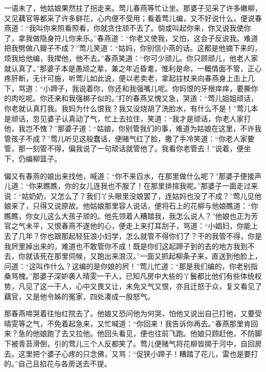 一语未了，他姑娘果然拄了拐走来。莺儿春燕等忙让坐。那婆子见采了许多嫩柳，又见藕官等都采了许多鲜花，心内便不受用；看着莺儿编，又不好说什么，便说春燕道：``我叫你来照看照看，你就贪住顽不去了。倘或叫起你来，你又说我使你了，拿我做隐身符儿你来乐。''春燕道：``你老又使我，又怕，这会子反说我。难道把我劈做八瓣子不成？''莺儿笑道：``姑妈，你别信小燕的话。这都是他摘下来的，烦我给他编，我撵他，他不去。''春燕笑道：``你可少顽儿。你只顾顽儿，他老人家就认真了。''那婆子本是愚顽之辈，兼之年近昏耄，惟利是命，一概情面不管，正心疼肝断，无计可施，听莺儿如此说，便以老卖老，拿起拄杖来向春燕身上击上几下，骂道：``小蹄子，我说着你，你还和我强嘴儿呢。你妈恨的牙根痒痒，要撕你的肉吃呢。你还来和我强梆子似的。''打的春燕又愧又急，哭道：``莺儿姐姐顽话，你老就认真打我。我妈为什么恨我？我又没烧胡了洗脸水，有什么不是！''莺儿本是顽话，忽见婆子认真动了气，忙上去拉住，笑道：``我才是顽话，你老人家打他，我岂不愧？''那婆子道：``姑娘，你别管我们的事，难道为姑娘在这里，不许我管孩子不成？''莺儿听见这般蠢话，便赌气红了脸，撒了手冷笑道：``你老人家要管，那一刻管不得，偏我说了一句顽话就管他了。我看你老管去！''说着，便坐下，仍编柳篮子。

偏又有春燕的娘出来找他，喊道：``你不来舀水，在那里做什么呢？''那婆子便接声儿道：``你来瞧瞧，你的女儿连我也不服了！在那里排揎我呢。''那婆子一面走过来说：``姑奶奶，又怎么了？我们丫头眼里没娘罢了，连姑妈也没了不成？''莺儿见他娘来了，只得又说原故。他姑娘那里容人说话，便将石上的花柳与他娘瞧道：``你瞧瞧，你女儿这么大孩子顽的。他先领着人糟踏我，我怎么说人？''他娘也正为芳官之气未平，又恨春燕不遂他的心，便走上来打耳刮子，骂道：``小娼妇，你能上去了几年？你也跟那起轻狂浪小妇学，怎么就管不得你们了？干的我管不得，你是我屄里掉出来的，难道也不敢管你不成！既是你们这起蹄子到的去的地方我到不去，你就该死在那里伺候，又跑出来浪汉。''一面又抓起柳条子来，直送到他脸上，问道：``这叫作什么？这编的是你娘的屄！''莺儿忙道：``那是我们编的，你老别指桑骂槐。''那婆子深妒袭人晴雯一干人，已知凡房中大些的丫鬟都比他们有些体统权势，凡见了这一干人，心中又畏又让，未免又气又恨，亦且迁怒于众，复又看见了藕官，又是他令姊的冤家，四处凑成一股怒气。

那春燕啼哭着往怡红院去了。他娘又恐问他为何哭，怕他又说出自己打他，又要受晴雯等之气，不免着起急来，又忙喊道：``你回来！我告诉你再去。''春燕那里肯回来？急的他娘跑了去又拉他。他回头看见，便也往前飞跑。他娘只顾赶他，不防脚下被青苔滑倒，引的莺儿三个人反都笑了。莺儿便赌气将花柳皆掷于河中，自回房去。这里把个婆子心疼的只念佛，又骂：``促狭小蹄子！糟踏了花儿，雷也是要打的。''自己且掐花与各房送去不提。

